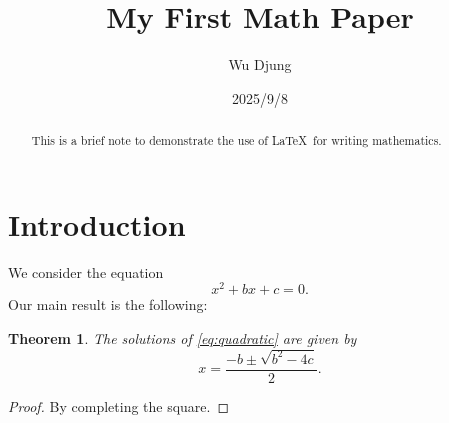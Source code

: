\documentclass[12pt]{article}
\title{My First Math Paper}
\author{Wu Djung}
\date{2025/9/8}
\newtheorem{theorem}{Theorem}
\begin{document}
\maketitle

\begin{abstract}
This is a brief note to demonstrate the use of \LaTeX\ for writing mathematics.
\end{abstract}

\section{Introduction}
We consider the equation
\begin{equation}\label{eq:quadratic}
x^2 + bx + c = 0.
\end{equation}
Our main result is the following:

\begin{theorem}\label{thm:main}
The solutions of \eqref{eq:quadratic} are given by
\[
x = \frac{-b \pm \sqrt{b^2 - 4c}}{2}.
\]
\end{theorem}

\begin{proof}
By completing the square.
\end{proof}
\end{document}
